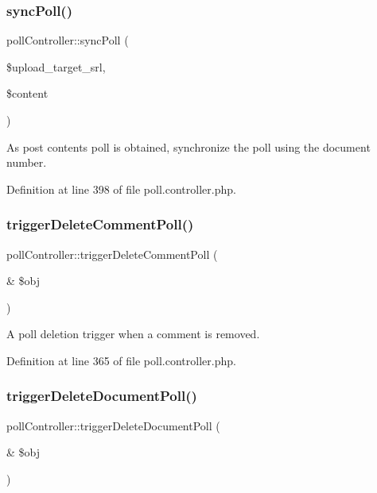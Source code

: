 \subsubsection{\texorpdfstring{sync\+Poll()}{syncPoll()}}
{\footnotesize\ttfamily poll\+Controller\+::sync\+Poll (\begin{DoxyParamCaption}\item[{}]{\$upload\+\_\+target\+\_\+srl,  }\item[{}]{\$content }\end{DoxyParamCaption})}



As post content\textquotesingle{}s poll is obtained, synchronize the poll using the document number. 



Definition at line 398 of file poll.\+controller.\+php.

\mbox{\label{classpollController_abd194582f292d00b57a524453ef256d3}} 
\subsubsection{\texorpdfstring{trigger\+Delete\+Comment\+Poll()}{triggerDeleteCommentPoll()}}
{\footnotesize\ttfamily poll\+Controller\+::trigger\+Delete\+Comment\+Poll (\begin{DoxyParamCaption}\item[{\&}]{\$obj }\end{DoxyParamCaption})}



A poll deletion trigger when a comment is removed. 



Definition at line 365 of file poll.\+controller.\+php.

\mbox{\label{classpollController_ac74ea74fb486787ce4c6c3c9fe3a91da}} 
\subsubsection{\texorpdfstring{trigger\+Delete\+Document\+Poll()}{triggerDeleteDocumentPoll()}}
{\footnotesize\ttfamily poll\+Controller\+::trigger\+Delete\+Document\+Poll (\begin{DoxyParamCaption}\item[{\&}]{\$obj }\end{DoxyParamCaption})}



